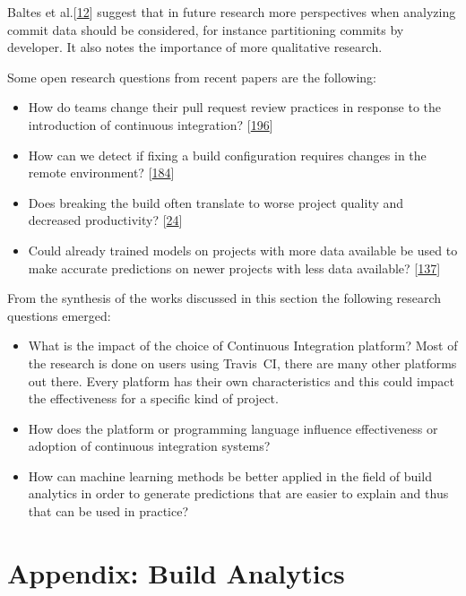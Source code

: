 \documentclass[]{book}
\providecommand{\tightlist}{%
  \setlength{\itemsep}{0pt}\setlength{\parskip}{0pt}}
\begin{document}
Baltes et al.{[}\protect\hyperlink{ref-baltes2018no}{12}{]} suggest that
in future research more perspectives when analyzing commit data should
be considered, for instance partitioning commits by developer. It also
notes the importance of more qualitative research.

Some open research questions from recent papers are the following:

\begin{itemize}
\tightlist
\item
  How do teams change their pull request review practices in response to
  the introduction of continuous integration?
  {[}\protect\hyperlink{ref-zhao2017impact}{196}{]}
\item
  How can we detect if fixing a build configuration requires changes in
  the remote environment?
  {[}\protect\hyperlink{ref-vassallo2018break}{184}{]}
\item
  Does breaking the build often translate to worse project quality and
  decreased productivity?
  {[}\protect\hyperlink{ref-beller2017oops}{24}{]}
\item
  Could already trained models on projects with more data available be
  used to make accurate predictions on newer projects with less data
  available? {[}\protect\hyperlink{ref-ni2018acona}{137}{]}
\end{itemize}

From the synthesis of the works discussed in this section the following
research questions emerged:

\begin{itemize}
\tightlist
\item
  What is the impact of the choice of Continuous Integration platform?
  Most of the research is done on users using Travis~CI, there are many
  other platforms out there. Every platform has their own
  characteristics and this could impact the effectiveness for a specific
  kind of project.
\item
  How does the platform or programming language influence effectiveness
  or adoption of continuous integration systems?
\item
  How can machine learning methods be better applied in the field of
  build analytics in order to generate predictions that are easier to
  explain and thus that can be used in practice?
\end{itemize}

\chapter*{Appendix: Build Analytics}\label{appendix-build-analytics}
\end{document}
